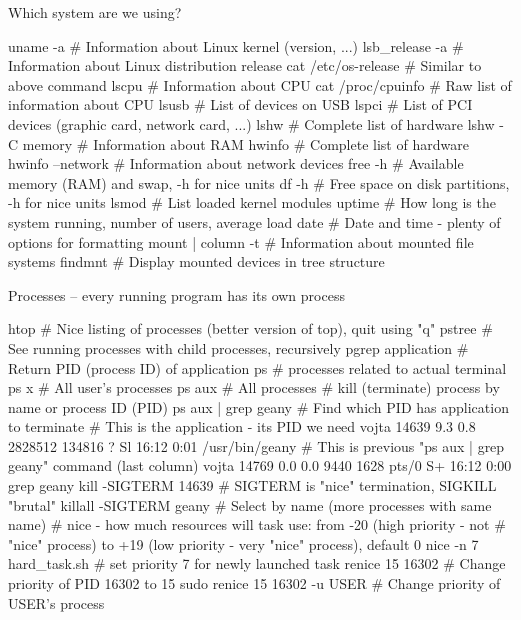 \documentclass[compress, ucs, xelatex, 11pt, xcolor=svgnames,
  hyperref={
    bookmarks=true,
    unicode=true,
    colorlinks=true,
    pdftitle={Linux, command line and MetaCentrum},
    plainpages=false,
    pdfauthor={Vojtech Zeisek},
    pdfsubject={Course about use of Linux command line, writing shell scripts and using MetaCentrum of CESNET},
    pdfcreator={XeLaTeX},
    pdfkeywords={Linux, GNU, BASH, shell, command line, MetaCentrum},
    linkcolor=Red,
    anchorcolor=Blue,
    citecolor=Purple,
    filecolor=DodgerBlue,
    menucolor=DarkOrchid,
    urlcolor=DeepSkyBlue,
    pdftex},
  url={hyphens, lowtilde} %
  ]{beamer}
\begin{document}
\begin{frame}[fragile]{Which system are we using?}
  \begin{bashcode}
    uname -a # Information about Linux kernel (version, ...)
    lsb_release -a # Information about Linux distribution release
    cat /etc/os-release # Similar to above command
    lscpu # Information about CPU
    cat /proc/cpuinfo # Raw list of information about CPU
    lsusb # List of devices on USB
    lspci # List of PCI devices (graphic card, network card, ...)
    lshw # Complete list of hardware
    lshw -C memory # Information about RAM
    hwinfo # Complete list of hardware
    hwinfo --network # Information about network devices
    free -h # Available memory (RAM) and swap, -h for nice units
    df -h # Free space on disk partitions, -h for nice units
    lsmod # List loaded kernel modules
    uptime # How long is the system running, number of users, average load
    date # Date and time - plenty of options for formatting
    mount | column -t # Information about mounted file systems
    findmnt # Display mounted devices in tree structure
  \end{bashcode}
\end{frame}

\begin{frame}[fragile]{Processes -- every running program has its own process}
  \begin{bashcode}
    htop # Nice listing of processes (better version of top), quit using "q"
    pstree # See running processes with child processes, recursively
    pgrep application # Return PID (process ID) of application
    ps # processes related to actual terminal
    ps x # All user's processes
    ps aux # All processes
    # kill (terminate) process by name or process ID (PID)
    ps aux | grep geany # Find which PID has application to terminate
    # This is the application - its PID we need
    vojta 14639 9.3 0.8 2828512 134816 ?   Sl 16:12 0:01 /usr/bin/geany
    # This is previous "ps aux | grep geany" command (last column)
    vojta 14769 0.0 0.0   9440  1628 pts/0 S+ 16:12 0:00 grep geany
    kill -SIGTERM 14639 # SIGTERM is "nice" termination, SIGKILL "brutal"
    killall -SIGTERM geany # Select by name (more processes with same name)
    # nice - how much resources will task use: from -20 (high priority - not
    # "nice" process) to +19 (low priority - very "nice" process), default 0
    nice -n 7 hard_task.sh # set priority 7 for newly launched task
    renice 15 16302 # Change priority of PID 16302 to 15
    sudo renice 15 16302 -u USER # Change priority of USER's process
  \end{bashcode}
\end{frame}
\end{document}
